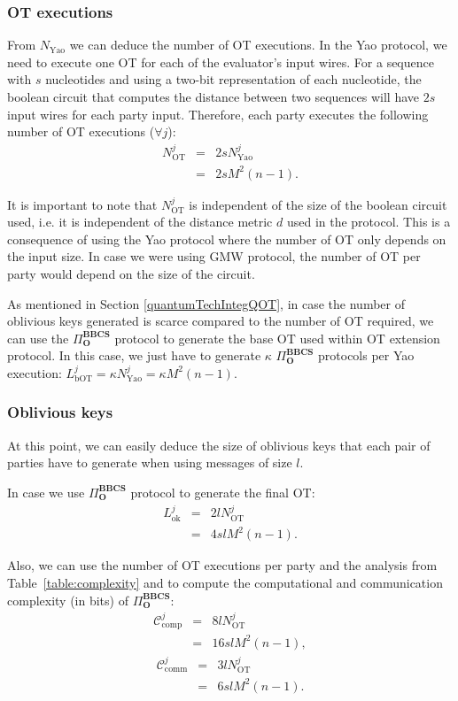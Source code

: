 \subsubsection{OT executions}
From $N_{\text{Yao}}$ we can deduce the number of OT executions. In the Yao protocol, we need to execute one OT for each of the evaluator's input wires. For a sequence with $s$ nucleotides and using a two-bit representation of each nucleotide, the boolean circuit that computes the distance between two sequences will have $2s$ input wires for each party input. Therefore, each party executes the following number of OT executions ($\forall j$):
\begin{eqnarray*}
N_{\text{OT}}^j &=& 2sN^j_\text{Yao}  \\
&=& 2sM^2(n-1).
\end{eqnarray*}

It is important to note that $N_{\text{OT}}^j$ is independent of the size of the boolean circuit used, i.e. it is independent of the distance metric $d$ used in the protocol. This is a consequence of using the Yao protocol where the number of OT only depends on the input size. In case we were using GMW \cite{Goldreich87} protocol, the number of OT per party would depend on the size of the circuit.

As mentioned in Section \ref{quantumTechIntegQOT}, in case the number of oblivious keys generated is scarce compared to the number of OT required, we can use the $\Pi^{\textbf{BBCS}}_{\textbf{O}}$ protocol to generate the base OT used within OT extension protocol. In this case, we just have to generate $\kappa$ $\Pi^{\textbf{BBCS}}_{\textbf{O}}$ protocols per Yao execution: $L^j_\text{bOT} = \kappa N^j_\text{Yao}  = \kappa M^2(n-1)$.

\subsubsection{Oblivious keys}
At this point, we can easily deduce the size of oblivious keys that each pair of parties have to generate when using messages of size $l$. 

In case we use $\Pi^{\textbf{BBCS}}_{\textbf{O}}$ protocol to generate the final OT:
\begin{eqnarray*}
L^j_{\text{ok}} &=& 2l N_{\text{OT}}^j \\
&=& 4slM^2(n-1).
\end{eqnarray*}

Also, we can use the number of OT executions per party and the analysis from Table~\ref{table:complexity} and \cite{SPM21} to compute the computational and communication complexity (in bits) of $\Pi^{\textbf{BBCS}}_{\textbf{O}}$:
\begin{eqnarray*}
\mathcal{C}^j_{\text{comp}} &=&  8l N_{\text{OT}}^j \\
&=& 16 slM^2(n-1),
\end{eqnarray*}
\begin{eqnarray*}
\mathcal{C}^j_{\text{comm}} &=&  3l N_{\text{OT}}^j \\
&=& 6 slM^2(n-1).
\end{eqnarray*}


